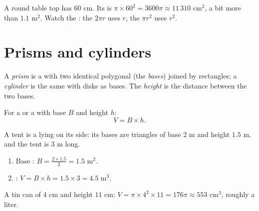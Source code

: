 \begin{example}\label{ex:g7:areas:disk}
A round table top has  $60$ cm. Its  is
$\pi \times 60^2 = 3600\pi \approx 11\,310$ cm$^2$, a bit more than
$1.1$ m$^2$. Watch the : the \emph{} $2\pi r$ uses
$r$, the \emph{} $\pi r^2$ uses $r^2$.
\end{example}

\section{Prisms and cylinders}

\begin{definition}\label{def:g7:areas:prism}
A \emph{prism} is a  with two identical 
polygonal  (the \emph{bases}) joined by rectangles; a
\emph{cylinder} is the same with disks as bases. The
\emph{height} is the distance between the two bases.
\end{definition}

\begin{theorem}[Volumes]\label{thm:g7:areas:volume}
For a  or a  with base  $B$ and height $h$:
\[
V = B \times h .
\]
\end{theorem}
\admitted

\begin{example}\label{ex:g7:areas:volume}
A tent is a  lying on its side: its bases are triangles of base
$2$ m and height $1.5$ m, and the tent is $3$ m long.
\begin{enumerate}
  \item Base : $B = \frac{2 \times 1.5}{2} = 1.5$ m$^2$.
  \item {}: $V = B \times h = 1.5 \times 3 = 4.5$ m$^3$.
\end{enumerate}
A tin can of  $4$ cm and height $11$ cm:
$V = \pi \times 4^2 \times 11 = 176\pi \approx 553$ cm$^3$, roughly
 a liter.
\end{example}

